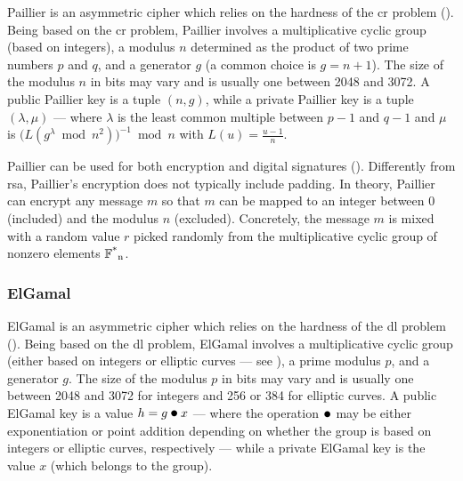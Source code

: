 Paillier \cite{stern_public_1999} is an asymmetric cipher which relies on the hardness of the \gls{cr} problem (). Being based on the \gls{cr} problem, Paillier involves a multiplicative cyclic group (based on integers), a modulus $n$ determined as the product of two prime numbers $p$ and $q$, and a generator $g$ (a common choice is $g = n + 1$). The size of the modulus $n$ in bits may vary and is usually one between 2048 and 3072. A public Paillier key is a tuple $(n, g)$, while a private Paillier key is a tuple $(\lambda, \mu)$ --- where $\lambda$ is the least common multiple between $p-1$ and $q-1$ and $\mu$ is $\bigl(L(g^\lambda \bmod n^2)\bigr)^{-1}\bmod n$ with $L(u) = \frac{u - 1}{n}$.

Paillier can be used for both encryption and digital signatures (). Differently from \gls{rsa}, Paillier's encryption does not typically include padding. In theory, Paillier can encrypt any message $m$ so that $m$ can be mapped to an integer between $0$ (included) and the modulus $n$ (excluded). Concretely, the message $m$ is mixed with a random value $r$ picked randomly from the multiplicative cyclic group of nonzero elements $\mathbb{F}\textsuperscript{*}\textsubscript{n}$.



\subsubsection{ElGamal}\label{sec:asymmetric_cryptography:ciphers:elgamal}

ElGamal \cite{elgamal_public_1985} is an asymmetric cipher which relies on the hardness of the \gls{dl} problem (). Being based on the \gls{dl} problem, ElGamal involves a multiplicative cyclic group (either based on integers or elliptic curves --- see ), a prime modulus $p$, and a generator $g$. The size of the modulus $p$ in bits may vary and is usually one between 2048 and 3072 for integers and 256 or 384 for elliptic curves. A public ElGamal key is a value $h = g \bigcdot x$ --- where the operation $\bigcdot$ may be either exponentiation or point addition depending on whether the group is based on integers or elliptic curves, respectively --- while a private ElGamal key is the value $x$ (which belongs to the group).


